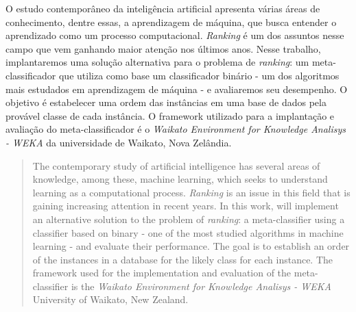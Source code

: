 \documentclass[12pt, a4paper]{abnt}
\begin{document}
\begin{resumo}
O estudo contemporâneo da inteligência artificial apresenta várias áreas de conhecimento, dentre essas, a aprendizagem de máquina, que busca entender o aprendizado como um processo computacional. \emph{Ranking} é um dos assuntos nesse campo que vem ganhando maior atenção nos últimos anos. Nesse trabalho, implantaremos uma solução alternativa para o problema de \emph{ranking}: um meta-classificador que utiliza como base um classificador binário - um dos algoritmos mais estudados em aprendizagem de máquina - e avaliaremos seu desempenho. O objetivo é estabelecer uma ordem das instâncias em uma base de dados pela provável classe de cada instância. O framework utilizado para a implantação e avaliação do meta-classificador é o \emph{Waikato Environment for Knowledge Analisys - WEKA} da universidade de Waikato, Nova Zelândia.
\end{resumo}

\begin{abstract}
The contemporary study of artificial intelligence has several areas of knowledge, among these, machine learning, which seeks to understand learning as a computational process. \emph{Ranking} is an issue in this field that is gaining increasing attention in recent years. In this work, will implement an alternative solution to the problem of \emph{ranking}: a meta-classifier using a classifier based on binary - one of the most studied algorithms in machine learning - and evaluate their performance. The goal is to establish an order of the instances in a database for the likely class for each instance. The framework used for the implementation and evaluation of the meta-classifier is the \emph{Waikato Environment for Knowledge Analisys - WEKA} University of Waikato, New Zealand.
\end{abstract}
\end{document}

